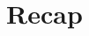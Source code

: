 \documentclass[11pt, oneside]{article}   	%
\begin{document}
%
%
%
%
%
%
%
%

\newpage

\section{Recap}
\end{document}
